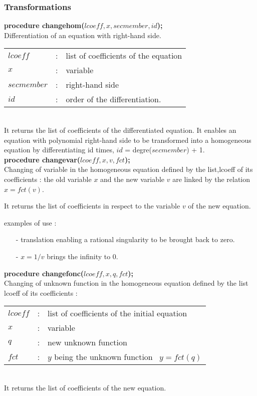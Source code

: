 \subsubsection{Transformations}

\textbf{procedure changehom($lcoeff,x,secmember,id$);} \\
%
Differentiation of an equation with right-hand side. \\
\begin{tabular}{lcl}
$lcoeff$ & : & list of coefficients of the equation \\
$x$ & : & variable \\
$secmember$ & : & right-hand side \\
$id$ & : & order of the differentiation.
\end{tabular} \\
%
It returns the list of coefficients of the differentiated equation.
It enables an equation with polynomial right-hand side to be transformed
into a homogeneous equation by differentiating id times,
$id$ = degre($secmember$) + 1. \\
%
\textbf{procedure changevar($lcoeff,x,v,fct$);} \\
%
Changing of variable in the homogeneous equation defined by the list,lcoeff
of its coefficients : the old variable $x$ and the new variable $v$ are linked
by the relation $x = fct(v)$. \par

It returns the list of coefficients in respect to the variable $v$ of the new
equation. 

examples of use : 

\begin{itemize}
\item[-] translation enabling a rational singularity to be brought back to zero.
\item[-] $x = 1/v$ brings the infinity to 0.
\end{itemize}

\textbf{procedure changefonc($lcoeff,x,q,fct$);} \\
%
Changing of unknown function in the homogeneous equation defined by the
list lcoeff of its coefficients : \\
%
\begin{tabular}{lcl}
$lcoeff$ & : & list of coefficients of the initial equation \\
$x$      & : & variable \\
$q$ & : & new unknown function \\
$fct$ & : & $y$ being the unknown function~ $y = fct(q)$ 
\end{tabular} \\
%
It returns the list of coefficients of the new equation. 

